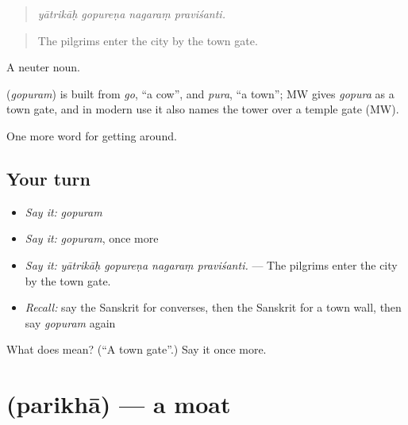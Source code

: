 \begin{quote}
   
\end{quote}

\begin{quote}
\emph{yātrikāḥ gopureṇa nagaraṃ praviśanti.}
\end{quote}

\begin{quote}
The pilgrims enter the city by the town gate.
\end{quote}

A neuter noun.

\begin{cousinweb}
\textbf{} (\emph{gopuram}) is built from \emph{go}, \textquotedblleft{}a cow\textquotedblright{}, and \emph{pura}, \textquotedblleft{}a town\textquotedblright{}; MW gives \emph{gopura} as a town gate, and in modern use it also names the tower over a temple gate (MW).
\end{cousinweb}

\begin{grammarlens}[title={What you've built}]
One more word for getting around.
\end{grammarlens}

\subsection*{Your turn}
\begin{itemize}
\raggedright
  \item \emph{Say it:} \emph{gopuram}
  \item \emph{Say it:} \emph{gopuram}, once more
  \item \emph{Say it:} \emph{yātrikāḥ gopureṇa nagaraṃ praviśanti.} — The pilgrims enter the city by the town gate.
  \item \emph{Recall:} say the Sanskrit for converses, then the Sanskrit for a town wall, then say \emph{gopuram} again
\end{itemize}

\begin{tcolorbox}[breakable,colback=teal!4,colframe=teal!35!black,title={Before you move on}]
What does  mean? (\textquotedblleft{}A town gate\textquotedblright{}.) Say it once more.
\end{tcolorbox}
\section[\texorpdfstring{\sk{परिखा} (parikhā)}{परिखा (parikhā)}]{ (parikhā) — a moat}

